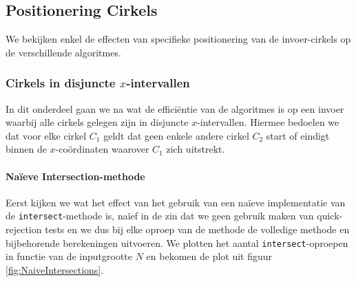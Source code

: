 \documentclass[12pt]{article}
\begin{document}
\subsection{Positionering Cirkels}
We bekijken enkel de effecten van specifieke positionering van de invoer-cirkels op de verschillende algoritmes.

\subsubsection{Cirkels in disjuncte $x$-intervallen}
In dit onderdeel gaan we na wat de efficiëntie van de algoritmes is op een invoer waarbij alle cirkels gelegen zijn in disjuncte $x$-intervallen. Hiermee bedoelen we dat voor elke cirkel $C_1$ geldt dat geen enkele andere cirkel $C_2$ start of eindigt binnen de $x$-coördinaten waarover $C_1$ zich uitstrekt.

\paragraph{Naïeve Intersection-methode}
Eerst kijken we wat het effect van het gebruik van een naïeve implementatie van de \texttt{intersect}-methode is, naïef in de zin dat we geen gebruik maken van quick-rejection tests en we dus bij elke oproep van de methode de volledige methode en bijbehorende berekeningen uitvoeren. We plotten het aantal \texttt{intersect}-oproepen in functie van de inputgrootte $N$ en bekomen de plot uit figuur \ref{fig:NaiveIntersections}.
\end{document}
